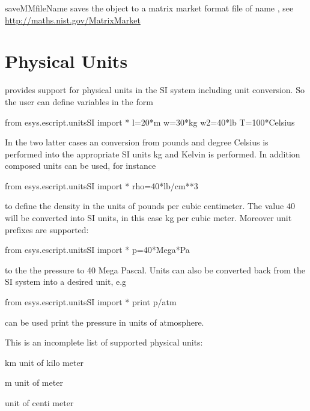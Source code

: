 \begin{methoddesc}[Operator]{saveMM}{fileName}
saves the object to a matrix market format file of name
, see
\url{http://maths.nist.gov/MatrixMarket}
\end{methoddesc}

\section{Physical Units}
\escript provides support for physical units in the SI system  including unit conversion. So the
user can define variables in the form
\begin{python}
from esys.escript.unitsSI import *
l=20*m
w=30*kg
w2=40*lb
T=100*Celsius
\end{python}
In the two latter cases an conversion from pounds and degree Celsius is performed into the appropriate SI units kg and Kelvin is performed. In addition
composed units can be used, for instance
\begin{python}
from esys.escript.unitsSI import *
rho=40*lb/cm**3
\end{python}
to define the density in the units of pounds per cubic centimeter. The value $40$ will be converted
into SI units, in this case kg per cubic meter.
Moreover unit prefixes are supported:
\begin{python}
from esys.escript.unitsSI import *
p=40*Mega*Pa
\end{python}
to the the pressure to 40 Mega Pascal. Units can also be converted back from the SI system into
a desired unit, e.g
\begin{python}
from esys.escript.unitsSI import *
print p/atm
\end{python}
can be used print the pressure in units of atmosphere.

This is an incomplete list of supported physical units:

\begin{datadesc}{km}
unit of kilo meter
\end{datadesc}

\begin{datadesc}{m}
unit of meter
\end{datadesc}

\begin{datadesc}{cm}
unit of centi meter
\end{datadesc}


